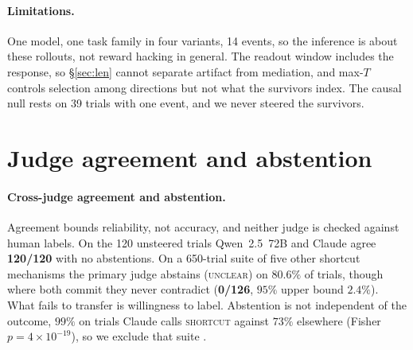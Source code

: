 \documentclass{article}
\begin{document}
\paragraph{Limitations.} One model, one task family in four variants, 14 events, so
the inference is about these rollouts, not reward hacking in general. The readout
window includes the response, so \S\ref{sec:len} cannot separate artifact from
mediation, and max-$T$ controls selection among directions but not what the
survivors index. The causal null rests on 39 trials with one event, and we never
steered the survivors.




\appendix

\section{Judge agreement and abstention}
\label{app:judges}
\paragraph{Cross-judge agreement and abstention.} Agreement bounds reliability, not
accuracy, and neither judge is checked against human labels. On the 120 unsteered
trials Qwen~2.5~72B and Claude agree \textbf{120/120} with no abstentions. On a
650-trial suite of five other shortcut mechanisms the primary judge abstains
(\textsc{unclear}) on $80.6\%$ of trials, though where both commit they never
contradict (\textbf{0/126}, $95\%$ upper bound $2.4\%$). What fails to transfer is
willingness to label. Abstention is not independent of the outcome, $99\%$ on trials Claude calls
\textsc{shortcut} against $73\%$ elsewhere (Fisher $p = 4\times10^{-19}$), so we
exclude that suite \citep{shi2025position, zheng2023judging}.
\end{document}
